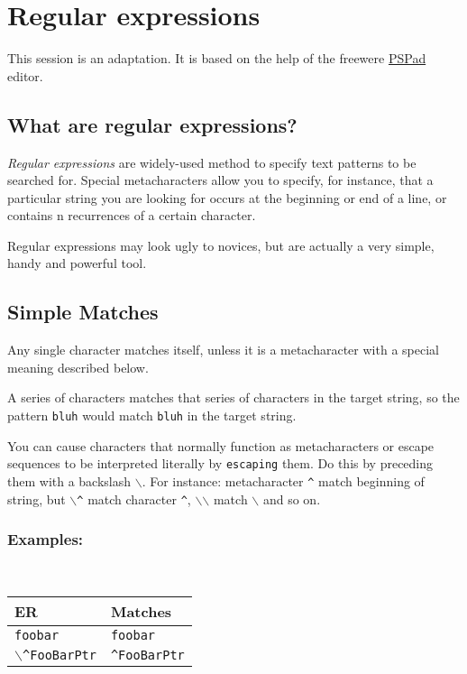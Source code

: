 
\hypertarget{working_regularexpressions}{}
\section{Regular expressions}

This session is an adaptation. It is based on the help of the
freewere \href{http://www.pspad.com/}{PSPad} editor.


\subsection{What are regular expressions?}

\textit{Regular expressions} are widely-used method to specify text patterns
to be searched for. Special metacharacters allow you to specify, for
instance, that a particular string you are looking for occurs at the
beginning or end of a line, or contains n recurrences of a certain character.

Regular expressions may look ugly to novices, but are actually a very simple,
handy and powerful tool.


\subsection{Simple Matches}

Any single character matches itself, unless it is a metacharacter with a
special meaning described below.

A series of characters matches that series of characters in the target
string, so the pattern \texttt{bluh} would match \texttt{bluh} in the
target string.

You can cause characters that normally function as metacharacters or
escape sequences to be interpreted literally by \texttt{escaping} them.
Do this by preceding them with a backslash \texttt{$\backslash$}. For
instance: metacharacter \texttt{\^{}} match beginning of string, but
\texttt{$\backslash$\^{}} match character \texttt{\^{}},
\texttt{$\backslash$$\backslash$} match \texttt{$\backslash$} and so on.


\subsubsection{Examples:}\\

\begin{footnotesize}
  \begin{tabularx}{\textwidth}{>{\hsize=0.3\hsize}X>{\hsize=0.7\hsize}X}\\
    \hline
    \textbf{ER} & \textbf{Matches} \\
    \hline
    \texttt{foobar} & \texttt{foobar} \\
    \texttt{$\backslash$\^{}FooBarPtr} & \texttt{\^{}FooBarPtr} \\
    \hline
  \end{tabularx}
\end{footnotesize}


